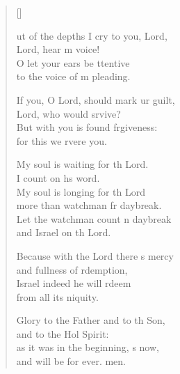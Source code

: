 \settowidth{\versewidth}{Out of the depths I cry to you, O Lord, *}
\begin{verse}[\versewidth]
  \begin{patverse}
ut of the depths I cry to you,  Lord,\Med\\
    Lord, hear m voice!\\
O let your ears be ttentive\Med\\
    to the voice of m pleading.

If you, O Lord, should mark ur guilt,\Med\\
    Lord, who would srvive?\\
But with you is found frgiveness:\Med\\
    for this we rvere you.

My soul is waiting for th Lord.\Med\\
    I count on h\pointup{\i}s word.\\
My soul is longing for th Lord\Med\\
    more than watchman fr daybreak.\\
Let the watchman count n daybreak\Med\\
    and Israel on th Lord.

Because with the Lord there \pointup{\i}s mercy\Med\\
    and fullness of rdemption,\\
Israel indeed he will rdeem\Med\\
    from all its \pointup{\i}niquity.

Glory to the Father and to th Son,\Med\\
    and to the Hol Spirit:\\
as it was in the beginning, \pointup{\i}s now,\Med\\
    and will be for ever. men.
  \end{patverse}
\end{verse}
